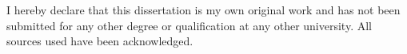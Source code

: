 I hereby declare that this dissertation is my own original work and has not been submitted for any other degree or qualification at any other university. All sources used have been acknowledged.
